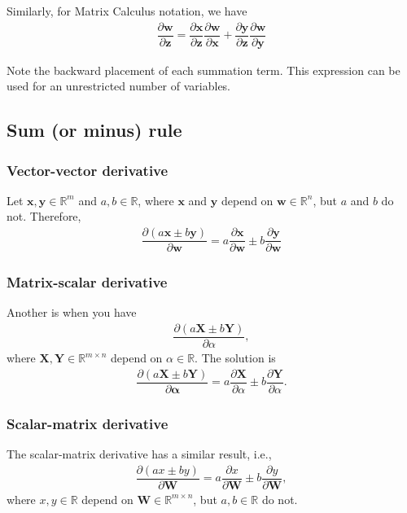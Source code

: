 \documentclass{article}
\begin{document}
Similarly, for Matrix Calculus notation, we have
\begin{align}
    \label{eq:chain-multi-inter}
    \dfrac{\partial \mathbf{w}}{\partial \mathbf{z}} = \dfrac{\partial \mathbf{x}}{\partial \mathbf{z}} \dfrac{\partial \mathbf{w}}{\partial \mathbf{x}} + \dfrac{\partial \mathbf{y}}{\partial \mathbf{z}} \dfrac{\partial \mathbf{w}}{\partial \mathbf{y}}
\end{align}

Note the backward placement of each summation term. This expression can be used for an unrestricted number of variables.

\subsection{Sum (or minus) rule}
\subsubsection{Vector-vector derivative}
Let \(\mathbf{x}, \mathbf{y} \in \mathbb{R}^{m}\) and \(a, b \in \mathbb{R}\), where \(\mathbf{x}\) and \(\mathbf{y}\) depend on \(\mathbf{w} \in \mathbb{R}^{n}\), but \(a\) and \(b\) do not. Therefore,
\begin{align}
    \dfrac{\partial (a\mathbf{x} \pm b\mathbf{y})}{\partial\mathbf{w}} = a\dfrac{\partial \mathbf{x}}{\partial\mathbf{w}} \pm b\dfrac{\partial \mathbf{y}}{\partial\mathbf{w}}
\end{align}
\subsubsection{Matrix-scalar derivative}
Another is when you have
\begin{align}
    \dfrac{\partial \left( a\mathbf{X} \pm b\mathbf{Y} \right)}{\partial \alpha},
\end{align}
where \(\mathbf{X}, \mathbf{Y} \in \mathbb{R}^{m \times n}\) depend on \(\alpha \in \mathbb{R}\). The solution is
\begin{align}
    \dfrac{\partial (a\mathbf{X} \pm b\mathbf{Y})}{\partial\mathbf{\alpha}} = a\dfrac{\partial \mathbf{X}}{\partial \alpha} \pm b \dfrac{\partial \mathbf{Y}}{\partial \alpha}.
\end{align}
\subsubsection{Scalar-matrix derivative}
The scalar-matrix derivative has a similar result, i.e.,
\begin{align}
    \dfrac{\partial \left( ax \pm by \right)}{\partial \mathbf{W}} = a\dfrac{\partial x}{\partial \mathbf{W}} \pm b \dfrac{\partial y}{\partial \mathbf{W}},
\end{align}
where \(x, y \in \mathbb{R}\) depend on \(\mathbf{W} \in \mathbb{R}^{m\times n}\), but \(a,b \in \mathbb{R}\) do not.
\end{document}
